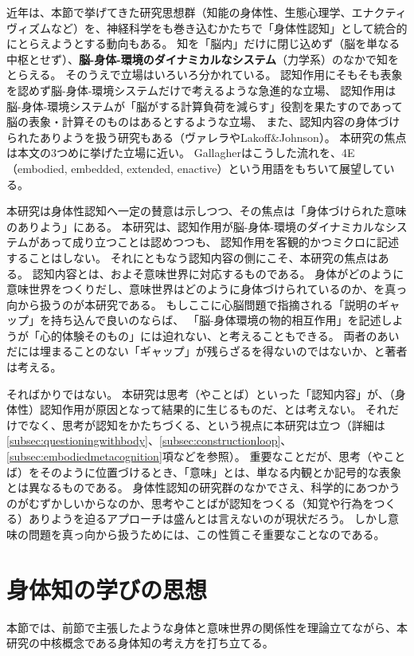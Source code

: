 近年は、本節で挙げてきた研究思想群（知能の身体性、生態心理学、エナクティヴィズムなど）を、神経科学をも巻き込むかたちで「身体性認知」として統合的にとらえようとする動向もある。
知を「脳内」だけに閉じ込めず（脳を単なる中枢とせず）、\textbf{脳-身体-環境のダイナミカルなシステム}（力学系）のなかで知をとらえる。
そのうえで立場はいろいろ分かれている。
認知作用にそもそも表象を認めず脳-身体-環境システムだけで考えるような急進的な立場、
認知作用は脳-身体-環境システムが「脳がする計算負荷を減らす」役割を果たすのであって脳の表象・計算そのものはあるとするような立場、
また、認知内容の身体づけられたありようを扱う研究もある（ヴァレラやLakoff\&Johnson\cite{lakoff_johnson}）。
本研究の焦点は本文の3つめに挙げた立場に近い。
Gallagher\cite{gallagher:2023}はこうした流れを、4E（embodied, embedded, extended, enactive）という用語をもちいて展望している。

本研究は身体性認知へ一定の賛意は示しつつ、その焦点は「身体づけられた意味のありよう」にある。
本研究は、認知作用が脳-身体-環境のダイナミカルなシステムがあって成り立つことは認めつつも、
認知作用を客観的かつミクロに記述することはしない。
それにともなう認知内容の側にこそ、本研究の焦点はある。
認知内容とは、およそ意味世界に対応するものである。
身体がどのように意味世界をつくりだし、意味世界はどのように身体づけられているのか、を真っ向から扱うのが本研究である。
もしここに心脳問題で指摘される「説明のギャップ」\cite{levine:1983}を持ち込んで良いのならば、
「脳-身体環境の物的相互作用」を記述しようが「心的体験そのもの」には迫れない、と考えることもできる。
両者のあいだには埋まることのない「ギャップ」が残らざるを得ないのではないか、と著者は考える。

そればかりではない。
本研究は思考（やことば）といった「認知内容」が、（身体性）認知作用が原因となって結果的に生じるものだ、とは考えない。
それだけでなく、思考が認知をかたちづくる、という視点に本研究は立つ（詳細は\ref{subsec:questioningwithbody}、\ref{subsec:constructionloop}、\ref{subsec:embodiedmetacognition}項などを参照）。
重要なことだが、思考（やことば）をそのように位置づけるとき、「意味」とは、単なる内観とか記号的な表象とは異なるものである。
身体性認知の研究群のなかでさえ、科学的にあつかうのがむずかしいからなのか、思考やことばが認知をつくる（知覚や行為をつくる）ありようを迫るアプローチは盛んとは言えないのが現状だろう。
しかし意味の問題を真っ向から扱うためには、この性質こそ重要なことなのである。
\section{身体知の学びの思想}
本節では、前節で主張したような身体と意味世界の関係性を理論立てながら、本研究の中核概念である身体知の考え方を打ち立てる。

